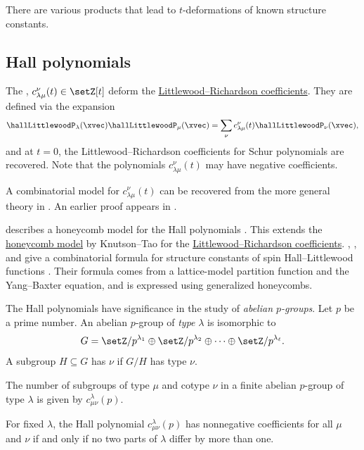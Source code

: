 There are various products that lead to $t$-deformations of known structure
constants.

\subsection[hallPolynomials]{Hall polynomials}

The \label{hallPolynomial},
$c^{\nu}_{\lambda\mu}(t) \in \setZ[t]$
deform the \hyperref[littlewoodRichardsonModels]{Littlewood--Richardson coefficients}.
They are defined via the expansion
\[
\hallLittlewoodP_\lambda(\xvec) \hallLittlewoodP_\mu(\xvec)
= \sum_\nu c^{\nu}_{\lambda\mu}(t) \hallLittlewoodP_\nu(\xvec),
\]
and at $t=0$, the Littlewood--Richardson coefficients for Schur polynomials
are recovered.
Note that the polynomials $c^{\nu}_{\lambda\mu}(t)$ may have negative coefficients.

A combinatorial model for $c^{\nu}_{\lambda\mu}(t)$ can be recovered
from the more general theory in \cite{Yip2012}.
An earlier proof appears in \cite{Schwer2006}.

 describes a honeycomb model for the Hall polynomials
\cite{ZinnJustin2019}.
This extends the \hyperref[knutsonTaoHoneycomb]{honeycomb model}
by Knutson--Tao for the \hyperref[littlewoodRichardsonModels]{Littlewood--Richardson coefficients}.
, , and 
give a combinatorial formula for structure constants of spin
Hall--Littlewood functions \cite{GunnaWheelerZinnJustin2025SpinHL}.  Their
formula comes from a lattice-model partition function and the Yang--Baxter
equation, and is expressed using generalized honeycombs.


The Hall polynomials have significance in the study of \emph{abelian $p$-groups}.
Let $p$ be a prime number.
An abelian $p$-group of \emph{type} $\lambda$ is isomorphic to
\[
G = \setZ/p^{\lambda_1} \oplus  \setZ/p^{\lambda_2} \oplus  \dotsb \oplus \setZ/p^{\lambda_\ell}.
\]
A subgroup $H \subseteq G$ has
\label{abelianPGroupCotype} $\nu$ if $G/H$ has type $\nu$.

\begin{theorem}
The number of subgroups of type $\mu$ and cotype $\nu$ in
a finite abelian $p$-group of type $\lambda$ is given by $c^{\lambda}_{\mu\nu}(p)$.
\end{theorem}

For fixed $\lambda$, the Hall polynomial $c^{\lambda}_{\mu\nu}(p)$ has nonnegative
coefficients for all $\mu$ and $\nu$ if and only if no two parts of $\lambda$
differ by more than one.

